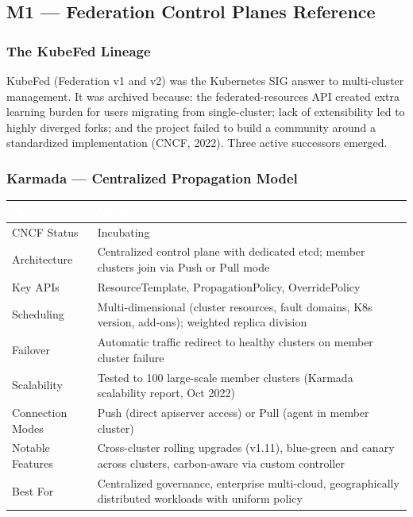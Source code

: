 \documentclass[11pt,letterpaper]{article}
\newcommand{\tableheader}[1]{\textbf{\sffamily\textcolor{white}{#1}}}
\begin{document}
\subsection{M1 --- Federation Control Planes Reference}

\subsubsection{The KubeFed Lineage}

KubeFed (Federation v1 and v2) was the Kubernetes SIG answer to multi-cluster management. It was archived because: the federated-resources API created extra learning burden for users migrating from single-cluster; lack of extensibility led to highly diverged forks; and the project failed to build a community around a standardized implementation (CNCF, 2022). Three active successors emerged.

\subsubsection{Karmada --- Centralized Propagation Model}

\begin{center}
\begin{tabularx}{\textwidth}{L{3cm}X}
\toprule
{}
\tableheader{Property} & \tableheader{Value} \\
\midrule
CNCF Status & Incubating \\
Architecture & Centralized control plane with dedicated etcd; member clusters join via Push or Pull mode \\
Key APIs & ResourceTemplate, PropagationPolicy, OverridePolicy \\
Scheduling & Multi-dimensional (cluster resources, fault domains, K8s version, add-ons); weighted replica division \\
Failover & Automatic traffic redirect to healthy clusters on member cluster failure \\
Scalability & Tested to 100 large-scale member clusters (Karmada scalability report, Oct 2022) \\
Connection Modes & Push (direct apiserver access) or Pull (agent in member cluster) \\
Notable Features & Cross-cluster rolling upgrades (v1.11), blue-green and canary across clusters, carbon-aware via custom controller \\
Best For & Centralized governance, enterprise multi-cloud, geographically distributed workloads with uniform policy \\
\bottomrule
\end{tabularx}
\end{center}
\end{document}
